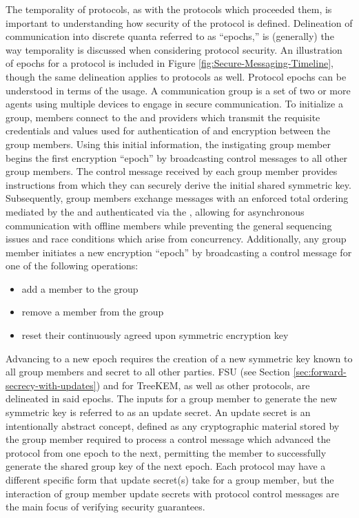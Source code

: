 The temporality of  protocols, as with the  protocols which proceeded them, is important to understanding how security of the protocol is defined.
Delineation of communication into discrete quanta referred to as ``epochs,'' is (generally) the way temporality is discussed when considering protocol security.
An illustration of epochs for a  protocol is included in Figure \ref{fig:Secure-Messaging-Timeline}, though the same delineation applies to  protocols as well.
Protocol epochs can be understood in terms of the  usage.
A communication group is a set of two or more agents using multiple devices to engage in secure communication.
To initialize a group, members connect to the  and  providers which transmit the requisite credentials and values used for authentication of and encryption between the group members.
Using this initial information, the instigating group member begins the first encryption ``epoch'' by broadcasting control messages to all other group members.
The control message received by each group member provides instructions from which they can securely derive the initial shared symmetric key.
Subsequently, group members exchange messages with an enforced total ordering \autocite{halmos1960naive} mediated by the  and authenticated via the , allowing for asynchronous communication with offline members while preventing the general sequencing issues and race conditions which arise from concurrency.
Additionally, any group member initiates a new encryption ``epoch'' by broadcasting a control message for one of the following operations:

\begin{itemize}
  \item add a member to the group
  \item remove a member from the group
  \item reset their continuously agreed upon symmetric encryption key
\end{itemize}

Advancing to a new epoch requires the creation of a new symmetric key known to all group members and secret to all other parties.
FSU (see Section \ref{sec:forward-secrecy-with-updates}) and  for TreeKEM, as well as other  protocols, are delineated in said epochs.
The inputs for a group member to generate the new symmetric key is referred to as an update secret.
An update secret is an intentionally abstract concept, defined as any cryptographic material stored by the group member required to process a control message which advanced the protocol from one epoch to the next, permitting the member to successfully generate the shared group key of the next epoch.
Each protocol may have a different specific form that update secret(s) take for a group member, but the interaction of group member update secrets with protocol control messages are the main focus of verifying security guarantees.


